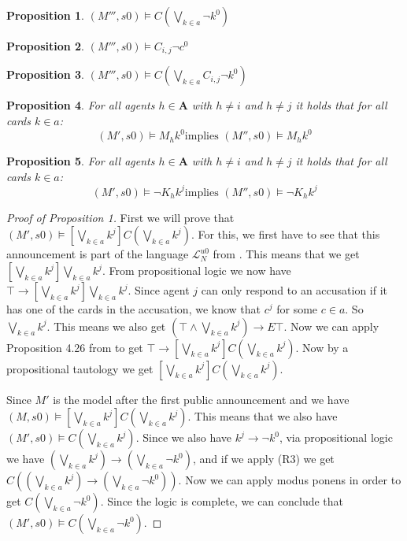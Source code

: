 \documentclass[a4paper, 10pt]{article}
\newcommand{\impl}{\rightarrow}
\newcommand{\A}{\mathbf{A}}
\newcommand{\DBox}[1]{\left[#1\right]}
\newtheorem{prop}{Proposition}
\begin{document}
\begin{prop}
    $(M''', s0) \models C(\bigvee_{k \in a} \neg k^0)$
\end{prop}
\begin{prop}
    $(M''', s0) \models C_{i, j} \neg c^0$
\end{prop}
\begin{prop}
    $(M''', s0) \models C(\bigvee_{k \in a} C_{i,j} \neg k^0)$
\end{prop}
\begin{prop}
    For all agents $h \in \A$ with $h \not = i$ and $h \not = j$ it holds
    that for all cards $k \in a$: \[ (M', s0) \models M_h k^0 \text{
            implies } (M'', s0) \models M_h k^0 \]
\end{prop}
\begin{prop}
    For all agents $h \in \A$ with $h \not = i$ and $h \not = j$ it holds
    that for all cards $k \in a$: \[ (M', s0) \models \neg K_h k^j \text{
            implies } (M'', s0) \models \neg K_h k^j \]
\end{prop}

\begin{proof}[Proof of Proposition 1]
    First we will prove that $(M', s0) \models \DBox{\bigvee_{k \in a} k^j}
    C(\bigvee_{k \in a} k^j)$. For this, we first have to see that this
    announcement is part of the language $\mathcal{L}_N^{u0}$ from
    \cite{ditmarsch2006secret}. This means that we get $\DBox{\bigvee_{k
            \in a} k^j} \bigvee_{k \in a} k^j$. From propositional logic we
    now have $\top \impl \DBox{\bigvee_{k \in a} k^j} \bigvee_{k \in a}
    k^j$. Since agent $j$ can only respond to an accusation if it has one
    of the cards in the accusation, we know that $c^j$ for some $c \in a$.
    So $\bigvee_{k \in a} k^j$. This means we also get $(\top \land
    \bigvee_{k \in a} k^j) \impl E\top$. Now we can apply Proposition 4.26
    from \citet{ditmarsch2007dynamic} to get $\top \impl \DBox{\bigvee_{k
            \in a} k^j} C\left(\bigvee_{k \in a} k^j\right)$. Now by a
    propositional tautology we get $\DBox{\bigvee_{k \in a} k^j}
    C\left(\bigvee_{k \in a} k^j\right)$.

    Since $M'$ is the model after the first public announcement and we have
    $(M, s0) \models \DBox{\bigvee_{k \in a} k^j} C\left(\bigvee_{k \in a}
        k^j\right)$. This means that we also have $(M', s0) \models
    C\left(\bigvee_{k \in a} k^j\right)$.  Since we also have $k^j \impl
    \neg k^0$, via propositional logic we have $\left(\bigvee_{k \in a} k^j
    \right) \impl \left(\bigvee_{k \in a} \neg k^0\right)$, and if we apply
    (R3) we get $C\left(\left(\bigvee_{k \in a} k^j \right) \impl
        \left(\bigvee_{k \in a} \neg k^0\right)\right)$. Now we can apply
    modus ponens in order to get $C\left(\bigvee_{k \in a} \neg
        k^0\right)$. Since the logic is complete, we can conclude that
    $(M', s0) \models C\left(\bigvee_{k \in a} \neg k^0\right)$.
\end{proof}
\end{document}
